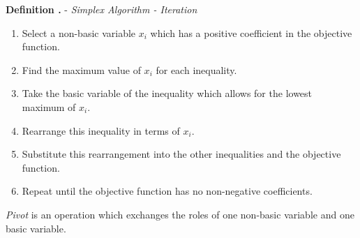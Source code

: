 \documentclass[11pt,a4paper]{article}
\begin{document}
\textbf{Definition .} - \textit{Simplex Algorithm - Iteration}
\begin{enumerate}[label=\roman*)]
  \item Select a non-basic variable $x_i$ which has a positive coefficient in the objective function.
  \item Find the maximum value of $x_i$ for each inequality.
  \item Take the basic variable of the inequality which allows for the lowest maximum of $x_i$.
  \item Rearrange this inequality in terms of $x_i$.
  \item Substitute this rearrangement into the other inequalities and the objective function.
  \item Repeat until the objective function has no non-negative coefficients.
\end{enumerate}

\textit{Pivot} is an operation which exchanges the roles of one non-basic variable and one basic variable.\\
\end{document}
